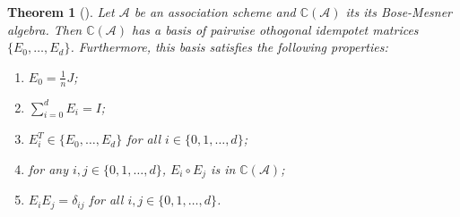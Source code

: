 \documentclass[a4paper,12pt]{article}
\theoremstyle{plain}
\newtheorem{theorem}{Theorem}
\theoremstyle{definition}
\theoremstyle{remark}
\begin{document}
\begin{theorem}[{\parencite[Theorem 3.4.4]{godsil_erdoskorado_2015}}]
    Let $ \mathcal{A} $ be an association scheme and $ \mathbb{C}(\mathcal{A}) $
    its its Bose-Mesner algebra. Then $ \mathbb{C}(\mathcal{A}) $ has a basis of
    pairwise othogonal idempotet matrices $ \{ E_0, \dots, E_d \} $. Furthermore,
    this basis satisfies the following properties:
    \begin{enumerate}[label=(\roman*)]
        \item $ E_0 = \frac{1}{n}J $;
        \item $ \sum_{ i=0 }^{ d } E_i = I $;
        \item $ E_i^T \in \{ E_0, \dots, E_d \} $ for all $ i \in \{ 0,1,\dots,d \} $;
        \item for any $ i,j \in \{ 0,1,\dots,d \} $, $ E_i \circ E_j $ is in
            $ \mathbb{C}(\mathcal{A}) $;
        \item $ E_iE_j = \delta_{ij} $ for all $ i,j \in \{ 0,1,\dots,d \} $.
    \end{enumerate}
    \label{th:idemp_mat_properties}
\end{theorem}
\end{document}
